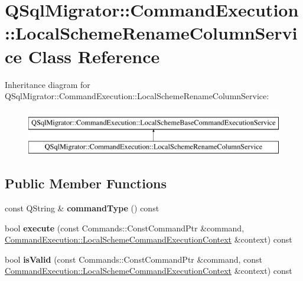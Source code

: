 \hypertarget{class_q_sql_migrator_1_1_command_execution_1_1_local_scheme_rename_column_service}{}\section{Q\+Sql\+Migrator\+:\+:Command\+Execution\+:\+:Local\+Scheme\+Rename\+Column\+Service Class Reference}
\label{class_q_sql_migrator_1_1_command_execution_1_1_local_scheme_rename_column_service}
Inheritance diagram for Q\+Sql\+Migrator\+:\+:Command\+Execution\+:\+:Local\+Scheme\+Rename\+Column\+Service\+:\begin{figure}[H]
\begin{center}
\leavevmode
\includegraphics[height=2.000000cm]{class_q_sql_migrator_1_1_command_execution_1_1_local_scheme_rename_column_service}
\end{center}
\end{figure}
\subsection*{Public Member Functions}
\begin{DoxyCompactItemize}
\item 
\mbox{\label{class_q_sql_migrator_1_1_command_execution_1_1_local_scheme_rename_column_service_a885c394d4e2da98a4b24bcfee172b1cf}} 
const Q\+String \& {\bfseries command\+Type} () const
\item 
\mbox{\label{class_q_sql_migrator_1_1_command_execution_1_1_local_scheme_rename_column_service_aaed41fdc84689c10d018b2c4e0a24ab8}} 
bool {\bfseries execute} (const Commands\+::\+Const\+Command\+Ptr \&command, \hyperlink{class_q_sql_migrator_1_1_command_execution_1_1_local_scheme_command_execution_context}{Command\+Execution\+::\+Local\+Scheme\+Command\+Execution\+Context} \&context) const
\item 
\mbox{\label{class_q_sql_migrator_1_1_command_execution_1_1_local_scheme_rename_column_service_ae4484fde51838d6313179c9f27c42f9c}} 
bool {\bfseries is\+Valid} (const Commands\+::\+Const\+Command\+Ptr \&command, const \hyperlink{class_q_sql_migrator_1_1_command_execution_1_1_local_scheme_command_execution_context}{Command\+Execution\+::\+Local\+Scheme\+Command\+Execution\+Context} \&context) const
\end{DoxyCompactItemize}


